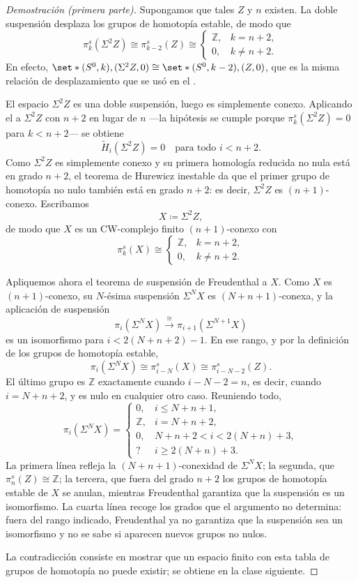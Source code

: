 \begin{proof}[Demostración (primera parte)]
Supongamos que tales $Z$ y $n$ existen. La doble suspensión desplaza los grupos de homotopía estable, de modo que
\[
\pi_k^s(\Sigma^2Z)\cong\pi_{k-2}^s(Z)\cong
\begin{cases}
\mathbb Z, & k=n+2,\\
0, & k\neq n+2 .
\end{cases}
\]
En efecto, $\set*{(S^0,k),(\Sigma^2Z,0)}\cong\set*{(S^0,k-2),(Z,0)}$, que es la misma relación de desplazamiento que se usó en el .

El espacio $\Sigma^2Z$ es una doble suspensión, luego es simplemente conexo. Aplicando el  a $\Sigma^2Z$ con $n+2$ en lugar de $n$ ---la hipótesis se cumple porque $\pi_k^s(\Sigma^2Z)=0$ para $k<n+2$--- se obtiene
\[
\tilde H_i(\Sigma^2Z)=0\quad\text{para todo }i<n+2 .
\]
Como $\Sigma^2Z$ es simplemente conexo y su primera homología reducida no nula está en grado $n+2$, el teorema de Hurewicz inestable da que el primer grupo de homotopía no nulo también está en grado $n+2$: es decir, $\Sigma^2Z$ es $(n+1)$-conexo. Escribamos
\[
X\coloneqq\Sigma^2Z,
\]
de modo que $X$ es un CW-complejo finito $(n+1)$-conexo con
\[
\pi_k^s(X)\cong
\begin{cases}
\mathbb Z, & k=n+2,\\
0, & k\neq n+2 .
\end{cases}
\]

Apliquemos ahora el teorema de suspensión de Freudenthal a $X$. Como $X$ es $(n+1)$-conexo, su $N$-ésima suspensión $\Sigma^NX$ es $(N+n+1)$-conexa, y la aplicación de suspensión
\[
\pi_i(\Sigma^NX)\xrightarrow{\ \cong\ }\pi_{i+1}(\Sigma^{N+1}X)
\]
es un isomorfismo para $i<2(N+n+2)-1$. En ese rango, y por la definición de los grupos de homotopía estable,
\[
\pi_i(\Sigma^NX)\cong\pi^s_{i-N}(X)\cong\pi^s_{i-N-2}(Z).
\]
El último grupo es $\mathbb Z$ exactamente cuando $i-N-2=n$, es decir, cuando $i=N+n+2$, y es nulo en cualquier otro caso. Reuniendo todo,
\[
\pi_i(\Sigma^NX)=
\begin{cases}
0, & i\le N+n+1,\\
\mathbb Z, & i=N+n+2,\\
0, & N+n+2<i<2(N+n)+3,\\
\text{?} & i\ge2(N+n)+3 .
\end{cases}
\]
La primera línea refleja la $(N+n+1)$-conexidad de $\Sigma^NX$; la segunda, que $\pi^s_n(Z)\cong\mathbb Z$; la tercera, que fuera del grado $n+2$ los grupos de homotopía estable de $X$ se anulan, mientras Freudenthal garantiza que la suspensión es un isomorfismo. La cuarta línea recoge los grados que el argumento no determina: fuera del rango indicado, Freudenthal ya no garantiza que la suspensión sea un isomorfismo y no se sabe si aparecen nuevos grupos no nulos.

La contradicción consiste en mostrar que un espacio finito con esta tabla de grupos de homotopía no puede existir; se obtiene en la clase siguiente.
\end{proof}

